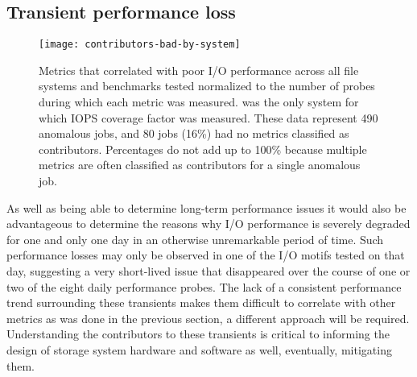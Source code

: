 \subsection{Transient performance loss} \label{sec:results/shortterm}



\begin{figure}
    \centering
    \texttt{[image: contributors-bad-by-system]}
    \vspace{-.35in}
    \caption{Metrics that correlated with poor I/O performance across all file systems and benchmarks tested normalized to the number of probes during which each metric was measured.
    \mira was the only system for which IOPS coverage factor was measured. 
    These data represent 490 anomalous jobs, and 80 jobs (16\%) had no metrics classified as contributors.
    Percentages do not add up to 100\% because multiple metrics are often classified as contributors for a single anomalous job.
    }
    \label{fig:contributors-bad-by-system}
\end{figure}

As well as being able to determine long-term performance issues it would also be advantageous to determine the reasons why I/O performance is severely degraded for one and only one day in an otherwise unremarkable period of time.
Such performance losses may only be observed in one of the I/O motifs tested on that day, suggesting a very short-lived issue that disappeared over the course of one or two of the eight daily performance probes.
The lack of a consistent performance trend surrounding these transients makes them difficult to correlate with other metrics as was done in the previous section, a different approach will be required. Understanding the contributors to these transients is critical to informing the design of storage system hardware and software as well, eventually, mitigating them. 

